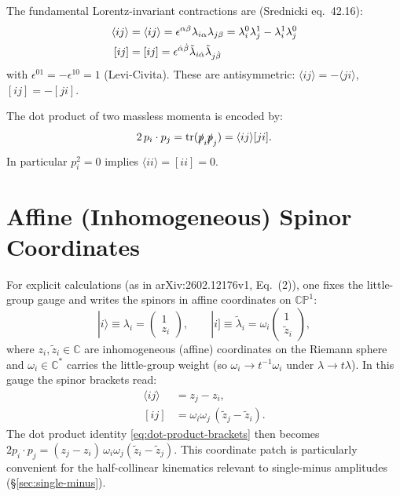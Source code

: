 The fundamental Lorentz-invariant contractions are (Srednicki eq.\ 42.16):
\begin{align}
\angleb{i}{j} &= \langle i j \rangle = \epsilon^{\alpha\beta} \lambda_{i\alpha} \lambda_{j\beta} = \lambda_i^0 \lambda_j^1 - \lambda_i^1 \lambda_j^0 \\
\squareb{i}{j} &= [i j] = \epsilon^{\dot{\alpha}\dot{\beta}} \tilde{\lambda}_{i\dot{\alpha}} \tilde{\lambda}_{j\dot{\beta}}
\end{align}
with $\epsilon^{01} = -\epsilon^{10} = 1$ (Levi-Civita). These are antisymmetric: $\langle ij\rangle = -\langle ji\rangle$, $[ij]=-[ji]$.

The dot product of two massless momenta is encoded by:
\begin{equation}
2\, p_i \cdot p_j = \mathrm{tr}(\slashed{p}_i \slashed{p}_j) = \langle i j \rangle [j i].
\label{eq:dot-product-brackets}
\end{equation}
In particular $p_i^2 = 0$ implies $\langle ii\rangle = [ii] = 0$.

\section{Affine (Inhomogeneous) Spinor Coordinates}
\label{sec:affine-spinors}

For explicit calculations (as in arXiv:2602.12176v1, Eq.~(2)), one fixes the little-group gauge and writes the spinors in affine coordinates on $\mathbb{CP}^1$:
\begin{equation}
|i\rangle \equiv \lambda_i = \begin{pmatrix} 1 \\ z_i \end{pmatrix}, \qquad
|i] \equiv \tilde{\lambda}_i = \omega_i \begin{pmatrix} 1 \\ \tilde{z}_i \end{pmatrix},
\end{equation}
where $z_i, \tilde{z}_i \in \mathbb{C}$ are inhomogeneous (affine) coordinates on the Riemann sphere and $\omega_i \in \mathbb{C}^*$ carries the little-group weight (so $\omega_i \to t^{-1}\omega_i$ under $\lambda\to t\lambda$). In this gauge the spinor brackets read:
\begin{align}
\langle ij\rangle &= z_j - z_i, \\
[ij] &= \omega_i \omega_j\, (\tilde{z}_j - \tilde{z}_i).
\end{align}
The dot product identity \eqref{eq:dot-product-brackets} then becomes $2p_i\cdot p_j = (z_j-z_i)\,\omega_i\omega_j(\tilde{z}_i - \tilde{z}_j)$. This coordinate patch is particularly convenient for the half-collinear kinematics relevant to single-minus amplitudes (\S\ref{sec:single-minus}).


